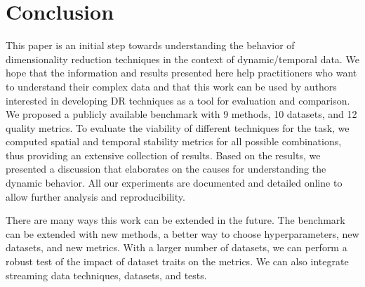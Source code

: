 \section{Conclusion}
\label{sec:conclusion}
%
This paper is an initial step towards understanding the behavior of dimensionality reduction techniques in the context of dynamic/temporal data. We hope that the information and results presented here help practitioners who want to understand their complex data and that this work can be used by authors interested in developing DR techniques as a tool for evaluation and comparison.
We proposed a publicly available benchmark with 9 methods, 10 datasets, and 12 quality metrics. To evaluate the viability of different techniques for the task, we computed spatial and temporal stability metrics for all possible combinations, thus providing an extensive collection of results. Based on the results, we presented a discussion that elaborates on the causes for understanding the dynamic behavior. All our experiments are documented and detailed online \cite{repo} to allow further analysis and reproducibility.

There are many ways this work can be extended in the future.
The benchmark can be extended with new methods, a better way to choose hyperparameters, new datasets, and new metrics. With a larger number of datasets, we can perform a robust test of the impact of dataset traits on the metrics.
We can also integrate streaming data techniques, datasets, and tests.


\newpage
    
